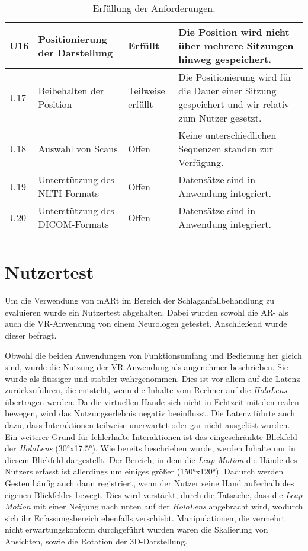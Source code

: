 \begin{longtable} {p{}p{}p{}p{}}
\midrule 
U16 & Positionierung der Darstellung & Erfüllt & Die Position wird nicht über mehrere Sitzungen hinweg gespeichert.\\
\midrule 
U17 & Beibehalten der Position & Teilweise erfüllt & Die Positionierung wird für die Dauer einer Sitzung gespeichert und wir relativ zum Nutzer gesetzt.\\
\midrule 
U18 & Auswahl von Scans & Offen & Keine unterschiedlichen Sequenzen standen zur Verfügung.\\
\midrule 
U19 & Unterstützung des NIfTI-Formats & Offen & Datensätze sind in Anwendung integriert.\\
\midrule 
U20 & Unterstützung des DICOM-Formats & Offen & Datensätze sind in Anwendung integriert.\\

\bottomrule
\caption{\label{tab:evaluation}Erfüllung der Anforderungen.}
\end{longtable}

\section{Nutzertest}
\label{nazuertest}

Um die Verwendung von mARt im Bereich der Schlaganfallbehandlung zu evaluieren wurde ein Nutzertest abgehalten. 
Dabei wurden sowohl die AR- als auch die VR-Anwendung von einem Neurologen getestet. Anschließend wurde dieser befragt.

Obwohl die beiden Anwendungen von Funktionsumfang und Bedienung her gleich sind, wurde die Nutzung der VR-Anwendung als angenehmer beschrieben. 
Sie wurde als flüssiger und stabiler wahrgenommen. 
Dies ist vor allem auf die Latenz zurückzuführen, die entsteht, wenn die Inhalte vom Rechner auf die \textit{HoloLens} übertragen werden. Da die virtuellen Hände sich nicht in Echtzeit mit den realen bewegen, wird das Nutzungserlebnis negativ beeinflusst. 
Die Latenz führte auch dazu, dass Interaktionen teilweise unerwartet oder gar nicht ausgelöst wurden. 
Ein weiterer Grund für fehlerhafte Interaktionen ist das eingeschränkte Blickfeld der \textit{HoloLens} (30°x17,5°). Wie bereits beschrieben wurde, werden Inhalte nur in diesem Blickfeld dargestellt. Der Bereich, in dem die \textit{Leap Motion} die Hände des Nutzers erfasst ist allerdings um einiges größer (150°x120°). Dadurch werden Gesten häufig auch dann registriert, wenn der Nutzer seine Hand außerhalb des eigenen Blickfeldes bewegt. Dies wird verstärkt, durch die Tatsache, dass die \textit{Leap Motion} mit einer Neigung nach unten auf der \textit{HoloLens} angebracht wird, wodurch sich ihr Erfassungsbereich ebenfalls verschiebt.
Manipulationen, die vermehrt nicht erwartungskonform durchgeführt wurden waren die Skalierung von Ansichten, sowie die Rotation der 3D-Darstellung.

